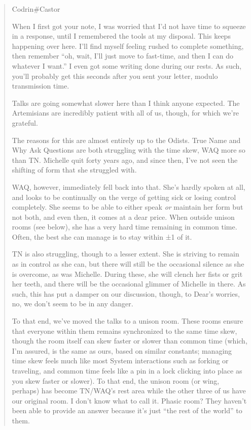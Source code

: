 \begin{quote}
Codrin\#Castor

When I first got your note, I was worried that I'd not have time to squeeze in a response, until I remembered the tools at my disposal. This keeps happening over here. I'll find myself feeling rushed to complete something, then remember ``oh, wait, I'll just move to fast-time, and then I can do whatever I want.'' I even got some writing done during our rests. As such, you'll probably get this seconds after you sent your letter, modulo transmission time.

Talks are going somewhat slower here than I think anyone expected. The Artemisians are incredibly patient with all of us, though, for which we're grateful.

The reasons for this are almost entirely up to the Odists. True Name and Why Ask Questions are both struggling with the time skew, WAQ more so than TN. Michelle quit forty years ago, and since then, I've not seen the shifting of form that she struggled with.

WAQ, however, immediately fell back into that. She's hardly spoken at all, and looks to be continually on the verge of getting sick or losing control completely. She seems to be able to either speak \emph{or} maintain her form but not both, and even then, it comes at a dear price. When outside unison rooms (see below), she has a very hard time remaining in common time. Often, the best she can manage is to stay within ±1 of it.

TN is also struggling, though to a lesser extent. She is striving to remain as in control as she can, but there will still be the occasional silence as she is overcome, as was Michelle. During these, she will clench her fists or grit her teeth, and there will be the occasional glimmer of Michelle in there. As such, this has put a damper on our discussion, though, to Dear's worries, no, we don't seem to be in any danger.

To that end, we've moved the talks to a unison room. These rooms ensure that everyone within them remains synchronized to the same time skew, though the room itself can skew faster or slower than common time (which, I'm assured, is the same as ours, based on similar constants; managing time skew feels much like most System interactions such as forking or traveling, and common time feels like a pin in a lock clicking into place as you skew faster or slower). To that end, the unison room (or wing, perhaps) has become TN/WAQ's rest area while the other three of us have our original room. I don't know what to call it. Phasic room? They haven't been able to provide an answer because it's just ``the rest of the world'' to them.


\end{quote}

